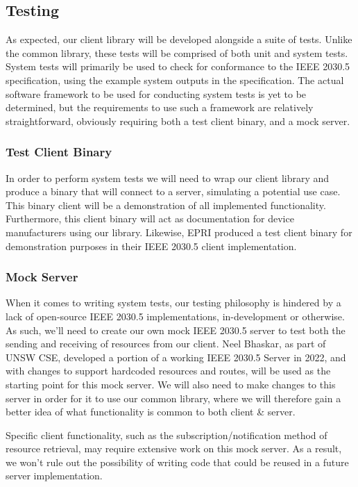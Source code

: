 \subsection{Testing}
As expected, our client library will be developed alongside a suite of tests. Unlike the common library, these tests will be comprised of both unit and system tests.
System tests will primarily be used to check for conformance to the IEEE 2030.5 specification, using the example system outputs in the specification.
The actual software framework to be used for conducting system tests is yet to be determined, but the requirements to use such a framework are relatively straightforward, obviously requiring both a test client binary, and a mock server.


\subsubsection{Test Client Binary}
In order to perform system tests we will need to wrap our client library and produce a binary that will connect to a server, simulating a potential use case.
This binary client will be a demonstration of all implemented functionality.
Furthermore, this client binary will act as documentation for device manufacturers using our library.
Likewise, EPRI produced a test client binary for demonstration purposes in their IEEE 2030.5 client implementation.

\subsubsection{Mock Server}

When it comes to writing system tests, our testing philosophy is hindered by a lack of open-source IEEE 2030.5 implementations, in-development or otherwise.
As such, we'll need to create our own mock IEEE 2030.5 server to test both the sending and receiving of resources from our client.
Neel Bhaskar, as part of UNSW CSE, developed a portion of a working IEEE 2030.5 Server in 2022, and with changes to support hardcoded resources and routes, will be used as the starting point for this mock server.
We will also need to make changes to this server in order for it to use our common library, where we will therefore gain a better idea of what functionality is common to both client \& server.

Specific client functionality, such as the subscription/notification method of resource retrieval, may require extensive work on this mock server. 
As a result, we won't rule out the possibility of writing code that could be reused in a future server implementation.










